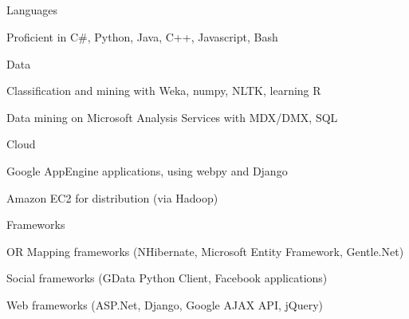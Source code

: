 \documentclass[a4paper,11pt,final]{article}
\newcommand{\resumetitle}[1]{%
  \subsection*{%
    \Large\sc{\textbf{#1}}%
  }%
  
}%
\newcommand{\resumedescheader}[1]{%
  \bigskip
  \resumetitle{#1}
}%
\newenvironment{resumedescription}{%
  \begin{basedescript}{\desclabelstyle{\multilinelabel}\desclabelwidth{0.15\linewidth}}{%
      \renewcommand{\makelabel}[1]{{##1}}%
    }%
      \setlength{\itemsep}{0pt}
}{%
  \end{basedescript}%
}
\begin{document}
\resumedescheader{Skills}
\begin{resumedescription}
\item [Languages]
\begin{itemize*}
  \item Proficient in C\#, Python, Java, C++, Javascript, Bash
\end{itemize*}

\item [Data] 
\begin{itemize*}
  \item Classification and mining with Weka, numpy, NLTK, learning R
  \item Data mining on Microsoft Analysis Services with MDX/DMX, SQL
\end{itemize*}

\item [Cloud] 
\begin{itemize*}
  \item Google AppEngine applications, using webpy and Django
  \item Amazon EC2 for distribution (via Hadoop)
\end{itemize*}

\item [Frameworks]
\begin{itemize*}
  \item OR Mapping frameworks (NHibernate, Microsoft Entity Framework, Gentle.Net)
  \item Social frameworks (GData Python Client, Facebook applications)
  \item Web frameworks (ASP.Net, Django, Google AJAX API, jQuery)
\end{itemize*}

\end{resumedescription}

\end{document}
